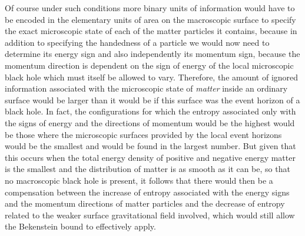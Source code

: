 \documentclass[notitlepage,12pt]{report}
\begin{document}
Of course under such conditions more binary units of information would have to be encoded in the elementary units of area on the macroscopic surface to specify the exact microscopic state of each of the matter particles it contains, because in addition to specifying the handedness of a particle we would now need to determine its energy sign and also independently its momentum sign, because the momentum direction is dependent on the sign of energy of the local microscopic black hole which must itself be allowed to vary. Therefore, the amount of ignored information associated with the microscopic state of \textit{matter} inside an ordinary surface would be larger than it would be if this surface was the event horizon of a black hole. In fact, the configurations for which the entropy associated only with the signs of energy and the directions of momentum would be the highest would be those where the microscopic surfaces provided by the local event horizons would be the smallest and would be found in the largest number. But given that this occurs when the total energy density of positive and negative energy matter is the smallest and the distribution of matter is as smooth as it can be, so that no macroscopic black hole is present, it follows that there would then be a compensation between the increase of entropy associated with the energy signs and the momentum directions of matter particles and the decrease of entropy related to the weaker surface gravitational field involved, which would still allow the Bekenstein bound to effectively apply.

\bigskip
\end{document}
